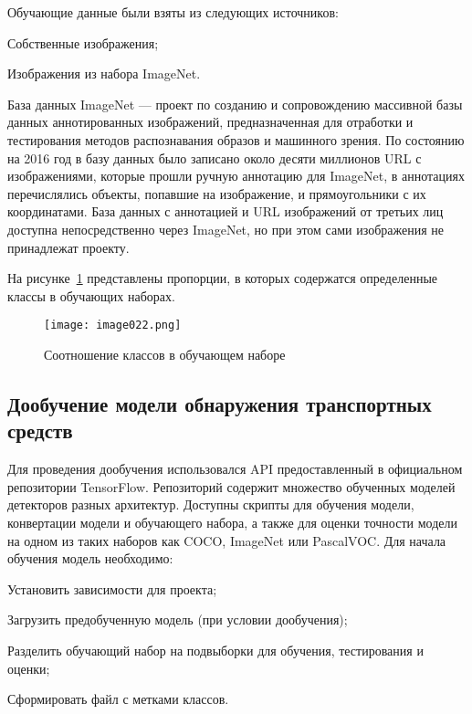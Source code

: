 Обучающие данные были взяты из следующих источников:
%
\begin{itemize*}
  \item Собственные изображения;
  \item Изображения из набора ImageNet\cite{nineteen}.
\end{itemize*}
%

База данных ImageNet — проект по созданию и сопровождению массивной базы данных аннотированных изображений, предназначенная для отработки и тестирования методов распознавания образов и машинного зрения. По состоянию на 2016 год в базу данных было записано около десяти миллионов URL с изображениями, которые прошли ручную аннотацию для ImageNet, в аннотациях перечислялись объекты, попавшие на изображение, и прямоугольники с их координатами. База данных с аннотацией и URL изображений от третьих лиц доступна непосредственно через ImageNet, но при этом сами изображения не принадлежат проекту.

На рисунке~\ref{fig:datasubsetproportions} представлены пропорции, в которых содержатся определенные классы в обучающих наборах.

\begin{figure}[htbp]
\centering
\texttt{[image: image022.png]}
\caption{Соотношение классов в обучающем наборе}%
\label{fig:datasubsetproportions}
\end{figure}

\subsection{Дообучение модели обнаружения транспортных средств}

Для проведения дообучения использовался API предоставленный в официальном репозитории TensorFlow\cite{twenty}. Репозиторий содержит множество обученных моделей детекторов разных архитектур. Доступны скрипты для обучения модели, конвертации модели и обучающего набора, а также для оценки точности модели на одном из таких наборов как COCO, ImageNet или PascalVOC. Для начала обучения модель необходимо:
%
\begin{itemize*}
  \item Установить зависимости для проекта;
  \item Загрузить предобученную модель (при условии дообучения);
  \item Разделить обучающий набор на подвыборки для обучения, тестирования и оценки;
  \item Сформировать файл с метками классов.
\end{itemize*}
%

